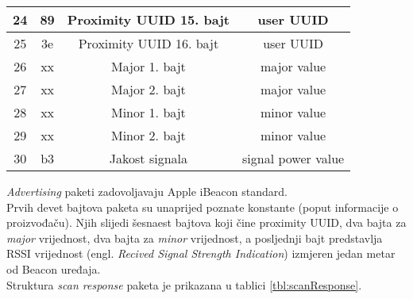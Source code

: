 \begin{table}
\begin{tabular}{|c|c|c|c|}
\hline 
24 & 89 & Proximity UUID 15. bajt & user UUID \\ 
\hline 
25 & 3e & Proximity UUID 16. bajt & user UUID \\ 
\hline 
26 & xx & Major 1. bajt & major value \\ 
\hline 
27 & xx & Major 2. bajt & major value \\ 
\hline 
28 & xx & Minor 1. bajt & minor value \\ 
\hline 
29 & xx & Minor 2. bajt & minor value \\ 
\hline 
30 & b3 & Jakost signala & signal power value \\ 
\hline 
\end{tabular} 
\end{table}
\textit{Advertising} paketi zadovoljavaju Apple iBeacon\textsuperscript{\texttrademark} standard.
\\
Prvih devet bajtova paketa su unaprijed poznate konstante (poput informacije o proizvođaču). Njih slijedi šesnaest bajtova koji čine proximity UUID, dva bajta za \textit{major} vrijednost, dva bajta za \textit{minor} vrijednost, a posljednji bajt predstavlja RSSI vrijednost (engl. \textit{Recived Signal Strength Indication}) izmjeren jedan metar od Beacon uređaja.
\\

Struktura \textit{scan response} paketa je prikazana u tablici \ref{tbl:scanResponse}.

\begin{table}
    \label{tbl:scanResponse}
\end{table}
